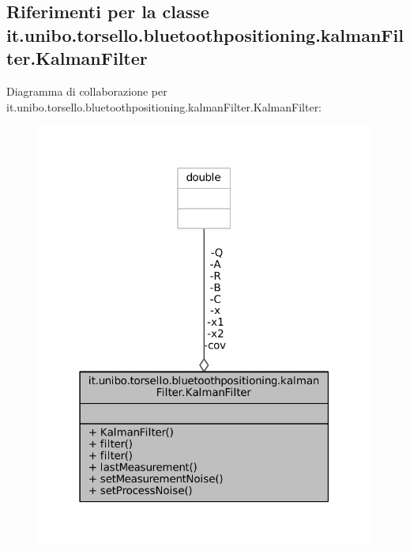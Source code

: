 \hypertarget{classit_1_1unibo_1_1torsello_1_1bluetoothpositioning_1_1kalmanFilter_1_1KalmanFilter}{}\subsection{Riferimenti per la classe it.\+unibo.\+torsello.\+bluetoothpositioning.\+kalman\+Filter.\+Kalman\+Filter}
\label{classit_1_1unibo_1_1torsello_1_1bluetoothpositioning_1_1kalmanFilter_1_1KalmanFilter}


Diagramma di collaborazione per it.\+unibo.\+torsello.\+bluetoothpositioning.\+kalman\+Filter.\+Kalman\+Filter\+:
\nopagebreak
\begin{figure}[H]
\begin{center}
\leavevmode
\includegraphics[width=316pt]{classit_1_1unibo_1_1torsello_1_1bluetoothpositioning_1_1kalmanFilter_1_1KalmanFilter__coll__graph}
\end{center}
\end{figure}
